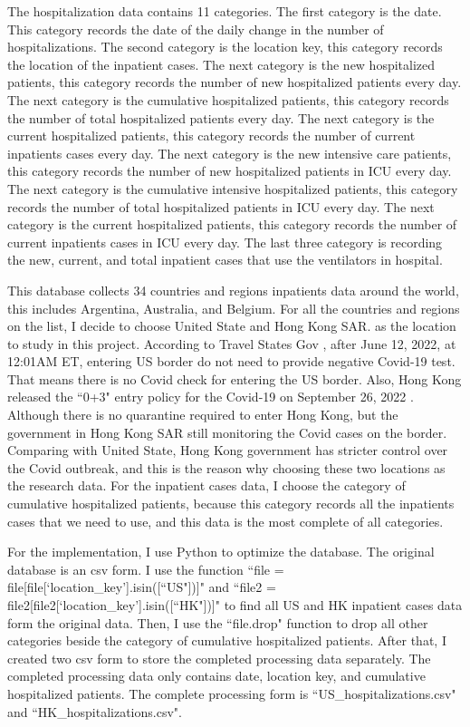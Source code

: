 \documentclass[12pt]{article}
\begin{document}
	The hospitalization data contains 11 categories. The first category is the date. This category records the date of the daily change in the number of hospitalizations. The second category is the location key, this category records the location of the inpatient cases. The next category is the new hospitalized patients, this category records the number of new hospitalized patients every day. The next category is the cumulative hospitalized patients, this category records the number of total hospitalized patients every day. The next category is the current hospitalized patients, this category records the number of current inpatients cases every day. The next category is the new intensive care patients, this category records the number of new hospitalized patients in ICU every day. The next category is the cumulative intensive hospitalized patients, this category records the number of total hospitalized patients in ICU every day. The next category is the current hospitalized patients, this category records the number of current inpatients cases in ICU every day. The last three category is recording the new, current, and total inpatient cases that use the ventilators in hospital.
	
	This database collects 34 countries and regions inpatients data around the world, this includes Argentina, Australia, and Belgium. For all the countries and regions on the list, I decide to choose United State and Hong Kong SAR. as the location to study in this project. According to Travel States Gov \cite{3}, after June 12, 2022, at 12:01AM ET, entering US border do not need to provide negative Covid-19 test. That means there is no Covid check for entering the US border. Also, Hong Kong released the ``0+3" entry policy for the Covid-19 on September 26, 2022 \cite{4}. Although there is no quarantine required to enter Hong Kong, but the government in Hong Kong SAR still monitoring the Covid cases on the border. Comparing with United State, Hong Kong government has stricter control over the Covid outbreak, and this is the reason why choosing these two locations as the research data. For the inpatient cases data, I choose the category of cumulative hospitalized patients, because this category records all the inpatients cases that we need to use, and this data is the most complete of all categories.
	
	For the implementation, I use Python to optimize the database. The original database is an csv form. I use the function ``file = file[file[`location_key'].isin([``US"])]" and ``file2 = file2[file2[`location_key'].isin([``HK"])]" to find all US and HK inpatient cases data form the original data. Then, I use the ``file.drop" function to drop all other categories beside the category of cumulative hospitalized patients. After that, I created two csv form to store the completed processing data separately. The completed processing data only contains date, location key, and cumulative hospitalized patients. The complete processing form is ``US_hospitalizations.csv" and ``HK_hospitalizations.csv".
\end{document}
